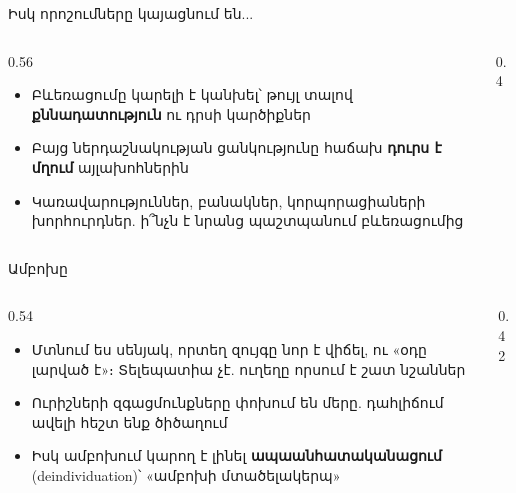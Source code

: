 \begin{frame}{Իսկ որոշումները կայացնում են...}
  \begin{columns}[c]
    \begin{column}{0.56\textwidth}
      \begin{itemize}
        \item Բևեռացումը կարելի է կանխել՝ թույլ տալով \textbf{քննադատություն} ու դրսի կարծիքներ
        \item Բայց ներդաշնակության ցանկությունը հաճախ \textbf{դուրս է մղում} այլախոհներին
        \item<2-> Կառավարություններ, բանակներ, կորպորացիաների խորհուրդներ. ի՞նչն է նրանց պաշտպանում բևեռացումից
      \end{itemize}
    \end{column}
    \begin{column}{0.4\textwidth}
      \centering
      \ \par\medskip
    \end{column}
  \end{columns}
\end{frame}

\begin{frame}{Ամբոխը}
  \begin{columns}[T]
    \begin{column}{0.54\textwidth}
      \begin{itemize}
        \item Մտնում ես սենյակ, որտեղ զույգը նոր է վիճել, ու «օդը լարված է»։ Տելեպատիա չէ. ուղեղը որսում է շատ նշաններ
        \item Ուրիշների զգացմունքները փոխում են մերը. դահլիճում ավելի հեշտ ենք ծիծաղում
        \item<2-> Իսկ ամբոխում կարող է լինել \textbf{ապաանհատականացում} (deindividuation)՝ «ամբոխի մտածելակերպ»
      \end{itemize}
    \end{column}
    \begin{column}{0.42\textwidth}
    \end{column}
  \end{columns}
\end{frame}

